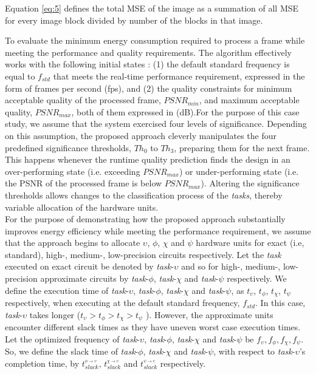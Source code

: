 \documentclass[journal]{IEEEtran}
\begin{document}
Equation \ref{eq:5} defines the total MSE of the image as a summation of all MSE for every image block divided by number of the blocks in that image.    

To evaluate the minimum energy consumption required to process a frame while meeting the performance and quality requirements. The algorithm effectively works with the following initial states  : (1) the default standard frequency is equal to $f_{std}$ that meets the real-time performance requirement, expressed in the form of frames per second (fps), and (2) the quality constraints for minimum acceptable quality of the processed frame, $PSNR_{min}$, and maximum acceptable quality, $PSNR_{max}$, both of them expressed in (dB).For the purpose of this case study, we assume that the system exercised four levels of significance. Depending on this assumption, the proposed approach cleverly manipulates the four predefined significance thresholds, $Th_0$ to $Th_3$, preparing them for the next frame. This happens whenever the runtime quality prediction finds the design in an over-performing state (i.e. exceeding $PSNR_{max}$) or under-performing state (i.e. the PSNR of the processed frame is below $PSNR_{max}$).
Altering the significance thresholds allows changes to the classification process of the \emph{tasks}, thereby variable allocation of the hardware units.\\

For the purpose of demonstrating how the proposed approach substantially improves energy efficiency while meeting the performance requirement, we assume that the approach begins to allocate  $\upsilon$, $\phi$, $\chi$ and $\psi$ hardware units for exact (i.e, standard), high-, medium-, low-precision circuits respectively. Let the \emph{task} executed on exact circuit be denoted by \emph{task}-{$\upsilon$} and so for high-, medium-, low-precision approximate circuits by \emph{task}-{$\phi$}, \emph{task}-{$\chi$} and \emph{task}-{$\psi$} respectively. We define the execution time of \emph{task}-{$\upsilon$}, \emph{task}-{$\phi$}, \emph{task}-{$\chi$} and \emph{task}-{$\psi$}, as $t_\upsilon$, $t_\phi$, $t_\chi$, $t_\psi$ respectively, when executing at the default standard frequency, $f_{std}$. In this case, \emph{task}-{$\upsilon$} takes longer ($t_\upsilon>t_\phi>t_\chi>t_\psi$ ). However, the approximate units encounter different slack times as they have uneven worst case execution times. Let the optimized frequency of \emph{task}-{$\upsilon$}, \emph{task}-{$\phi$}, \emph{task}-{$\chi$} and \emph{task}-{$\psi$} be $f_\upsilon, f_\phi, f_\chi, f_\psi$. So, we define the slack time of \emph{task}-{$\phi$}, \emph{task}-{$\chi$} and \emph{task}-{$\psi$}, with respect to \emph{task}-{$\upsilon$'s} completion time, by $t^{_{\phi \rightarrow \upsilon}}_{slack}$, $t^{_{\chi \rightarrow \upsilon}}_{slack}$ and $t^{_{\psi \rightarrow \upsilon}}_{slack}$ respectively.\\
\end{document}
